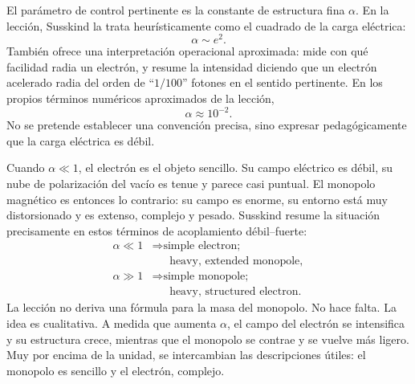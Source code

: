 El parámetro de control pertinente es la constante de estructura fina \(\alpha\). En la lección, Susskind la trata heurísticamente como el cuadrado de la carga eléctrica:
\begin{equation}
\alpha \sim e^2.
\end{equation}
También ofrece una interpretación operacional aproximada: mide con qué facilidad radia un electrón, y resume la intensidad diciendo que un electrón acelerado radia del orden de ``\(1/100\)'' fotones en el sentido pertinente. En los propios términos numéricos aproximados de la lección,
\begin{equation}
\alpha \approx 10^{-2}.
\end{equation}
No se pretende establecer una convención precisa, sino expresar pedagógicamente que la carga eléctrica es débil.


Cuando \(\alpha\ll 1\), el electrón es el objeto sencillo. Su campo eléctrico es débil, su nube de polarización del vacío es tenue y parece casi puntual. El monopolo magnético es entonces lo contrario: su campo es enorme, su entorno está muy distorsionado y es extenso, complejo y pesado. Susskind resume la situación precisamente en estos términos de acoplamiento débil--fuerte:
\begin{equation}
\begin{aligned}
\alpha \ll 1
&\Rightarrow \text{simple electron;}\\
&\phantom{\Rightarrow{}}\text{heavy, extended monopole},\\
\alpha \gg 1
&\Rightarrow \text{simple monopole;}\\
&\phantom{\Rightarrow{}}\text{heavy, structured electron}.
\end{aligned}
\end{equation}
La lección no deriva una fórmula para la masa del monopolo. No hace falta. La idea es cualitativa. A medida que aumenta \(\alpha\), el campo del electrón se intensifica y su estructura crece, mientras que el monopolo se contrae y se vuelve más ligero. Muy por encima de la unidad, se intercambian las descripciones útiles: el monopolo es sencillo y el electrón, complejo.

